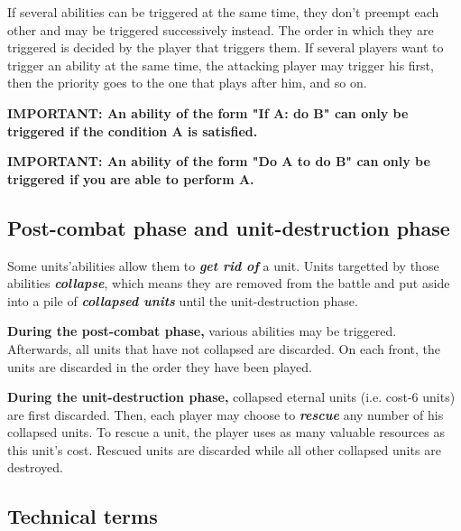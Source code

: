 \documentclass[a4paper]{article}
\begin{document}
    If several abilities can be triggered at the same time,
    they don't preempt each other and may be triggered successively instead.
    The order in which they are triggered is decided by the player that triggers them.
    If several players want to trigger an ability at the same time,
    the attacking player may trigger his first,
    then the priority goes to the one that plays after him, and so on.
    
    \hspace{-2em} \textbf{
    IMPORTANT: An ability of the form "\textbf{If} A\textbf{:} do B" can only be
    triggered if the condition A is satisfied.
    }
    
    \hspace{-2em} \textbf{
    IMPORTANT: An ability of the form "Do A \textbf{to} do B" can only be triggered
    if you are able to perform A.
    }
    

\newpage
  \subsection{Post-combat phase and unit-destruction phase}
    
    Some units'abilities allow them to \textbf{\textit{get rid of}} a unit.
    Units targetted by those abilities \textbf{\textit{collapse}},
    which means they are removed from the battle and put aside into a pile
    of \textbf{\textit{collapsed units}} until the unit-destruction phase.
    
    \textbf{During the post-combat phase,} various abilities may be triggered.
    Afterwards, all units that have not collapsed are discarded.
    On each front, the units are discarded in the order they have been played.
    
    \textbf{During the unit-destruction phase,} collapsed eternal units
    (i.e. cost-6 units) are first discarded.
    Then, each player may choose to \textbf{\textit{rescue}}
    any number of his collapsed units.
    To rescue a unit, the player uses as many valuable resources as this unit's cost.
    Rescued units are discarded while all other collapsed units are destroyed.
    

\newpage
  \subsection{Technical terms}
  
\end{document}
